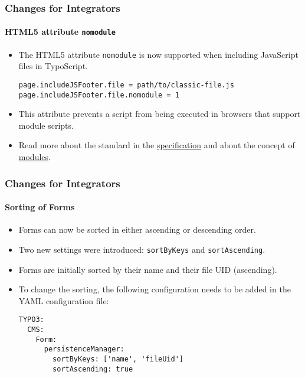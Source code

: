 
\begin{frame}[fragile]
	\frametitle{Changes for Integrators}
	\framesubtitle{HTML5 attribute \texttt{nomodule}}

	\lstset{basicstyle=\tiny\ttfamily}

	\begin{itemize}
		\item The HTML5 attribute \texttt{nomodule} is now supported when including JavaScript files in TypoScript.
\begin{lstlisting}
page.includeJSFooter.file = path/to/classic-file.js
page.includeJSFooter.file.nomodule = 1
\end{lstlisting}

		\item This attribute prevents a script from being executed in browsers that support module scripts.

		\item Read more about the standard in the
			\href{https://html.spec.whatwg.org/multipage/scripting.html#attr-script-nomodule}{specification}
			and about the concept of
			\href{https://hacks.mozilla.org/2015/08/es6-in-depth-modules/}{modules}.

	\end{itemize}


\end{frame}


\begin{frame}[fragile]
	\frametitle{Changes for Integrators}
	\framesubtitle{Sorting of Forms}

	\lstset{basicstyle=\tiny\ttfamily}

	\begin{itemize}
		\item Forms can now be sorted in either ascending or descending order.
		\item Two new settings were introduced: \texttt{sortByKeys} and \texttt{sortAscending}.
		\item Forms are initially sorted by their name and their file UID (ascending).
		\item To change the sorting, the following configuration needs to be added in the YAML configuration file:
\begin{lstlisting}
TYPO3:
  CMS:
    Form:
      persistenceManager:
        sortByKeys: ['name', 'fileUid']
        sortAscending: true
\end{lstlisting}

	\end{itemize}

\end{frame}


